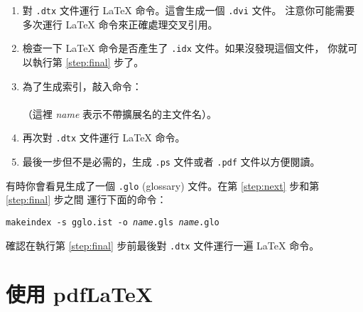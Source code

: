 \begin{enumerate}
\item 對 \texttt{.dtx} 文件運行 \LaTeX{} 命令。這會生成一個 \texttt{.dvi} 文件。
      注意你可能需要多次運行 \LaTeX{} 命令來正確處理交叉引用。
\item 檢查一下 \LaTeX{} 命令是否產生了 \texttt{.idx} 文件。如果沒發現這個文件，
      你就可以執行第 \ref{step:final} 步了。
\item 為了生成索引，敲入命令：\\
      \\
      （這裡 \textit{name} 表示不帶擴展名的主文件名）。
\item 再次對 \texttt{.dtx} 文件運行 \LaTeX{} 命令。\label{step:next}
\item 最後一步但不是必需的，生成 \texttt{.ps} 文件或者 \texttt{.pdf} 文件以方便閱讀。\label{step:final}

\end{enumerate}


有時你會看見生成了一個 \texttt{.glo}
(glossary) 文件。在第 \ref{step:next} 步和第 \ref{step:final} 步之間
運行下面的命令：

\noindent\texttt{makeindex -s gglo.ist -o \textit{name}.gls \textit{name}.glo}


\noindent
確認在執行第 \ref{step:final} 步前最後對 \texttt{.dtx} 文件運行一遍 \LaTeX{} 命令。



\section{使用 pdf\LaTeX} \label{sec:pdftex}
%


